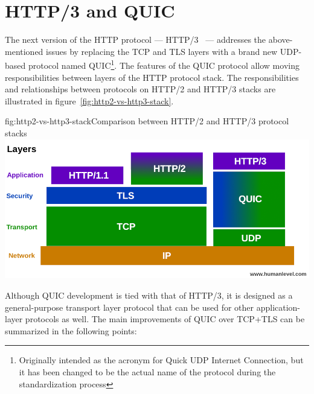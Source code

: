 \section{HTTP/3 and QUIC}

The next version of the HTTP protocol --- HTTP/3~\cite{draft-ietf-quic-http} --- addresses the
above-mentioned issues by replacing the TCP and TLS layers with a brand new UDP-based protocol named
QUIC\footnote{Originally intended as the acronym for Quick UDP Internet Connection, but it has been
changed to be the actual name of the protocol during the standardization process}. The features of
the QUIC protocol allow moving responsibilities between layers of the HTTP protocol stack. The
responsibilities and relationships between protocols on HTTP/2 and HTTP/3 stacks are illustrated in
figure~\ref{fig:http2-vs-http3-stack}.


\begin{myFigure}{fig:http2-vs-http3-stack}{Comparison between HTTP/2 and HTTP/3 protocol stacks}
  \includegraphics[width=\textwidth]{img/01-pile-http-protocol}
\end{myFigure}


Although QUIC development is tied with that of HTTP/3, it is designed as a general-purpose transport
layer protocol that can be used for other application-layer protocols as well. The main improvements
of QUIC over TCP+TLS can be summarized in the following points:

